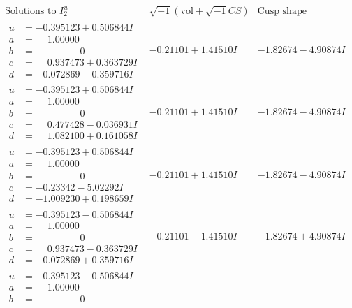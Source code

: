\documentclass[1p]{elsarticle_modified}
\theoremstyle{definition}
\newcommand{\I}{\sqrt{-1}}
\begin{document}
$$\begin{array}{c|c|c}  
\text{Solutions to }I^u_{2}& \I (\text{vol} + \sqrt{-1}CS) & \text{Cusp shape}\\
 \hline 
\begin{aligned}
u &= -0.395123 + 0.506844 I \\
a &= \phantom{-}1.00000\phantom{ +0.000000I} \\
b &= \phantom{-0.000000 } 0 \\
c &= \phantom{-}0.937473 + 0.363729 I \\
d &= -0.072869 - 0.359716 I\end{aligned}
 & -0.21101 + 1.41510 I & -1.82674 - 4.90874 I \\ \hline\begin{aligned}
u &= -0.395123 + 0.506844 I \\
a &= \phantom{-}1.00000\phantom{ +0.000000I} \\
b &= \phantom{-0.000000 } 0 \\
c &= \phantom{-}0.477428 - 0.036931 I \\
d &= \phantom{-}1.082100 + 0.161058 I\end{aligned}
 & -0.21101 + 1.41510 I & -1.82674 - 4.90874 I \\ \hline\begin{aligned}
u &= -0.395123 + 0.506844 I \\
a &= \phantom{-}1.00000\phantom{ +0.000000I} \\
b &= \phantom{-0.000000 } 0 \\
c &= -0.23342 - 5.02292 I \\
d &= -1.009230 + 0.198659 I\end{aligned}
 & -0.21101 + 1.41510 I & -1.82674 - 4.90874 I \\ \hline\begin{aligned}
u &= -0.395123 - 0.506844 I \\
a &= \phantom{-}1.00000\phantom{ +0.000000I} \\
b &= \phantom{-0.000000 } 0 \\
c &= \phantom{-}0.937473 - 0.363729 I \\
d &= -0.072869 + 0.359716 I\end{aligned}
 & -0.21101 - 1.41510 I & -1.82674 + 4.90874 I \\ \hline\begin{aligned}
u &= -0.395123 - 0.506844 I \\
a &= \phantom{-}1.00000\phantom{ +0.000000I} \\
b &= \phantom{-0.000000 } 0 \\

\end{aligned}
\end{array}$$
\end{document}
